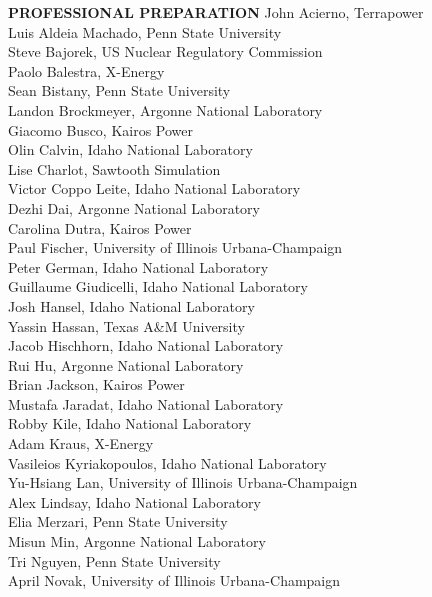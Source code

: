 \documentclass[11pt,letterpaper,english]{article}
\begin{document}
\begin{flushleft} {\bf PROFESSIONAL PREPARATION}
{John Acierno, Terrapower \\
Luis Aldeia Machado, Penn State University \\
Steve Bajorek, US Nuclear Regulatory Commission \\
Paolo Balestra, X-Energy \\
Sean Bistany, Penn State University \\
Landon	Brockmeyer, Argonne National Laboratory \\
Giacomo Busco, Kairos Power \\
Olin Calvin, Idaho National Laboratory \\
Lise Charlot, Sawtooth Simulation \\
Victor Coppo Leite, Idaho National Laboratory \\
Dezhi Dai, Argonne National Laboratory \\
Carolina Dutra, Kairos Power \\
Paul Fischer, University of Illinois Urbana-Champaign \\
Peter German, Idaho National Laboratory \\
Guillaume Giudicelli, Idaho National Laboratory \\
Josh Hansel, Idaho National Laboratory \\
Yassin Hassan, Texas A\&M University \\
Jacob Hischhorn, Idaho National Laboratory \\
Rui Hu, Argonne National Laboratory \\
Brian Jackson, Kairos Power \\
Mustafa Jaradat, Idaho National Laboratory \\
Robby Kile, Idaho National Laboratory \\
Adam Kraus, X-Energy \\
Vasileios Kyriakopoulos, Idaho National Laboratory \\
Yu-Hsiang Lan, University of Illinois Urbana-Champaign \\
Alex Lindsay, Idaho National Laboratory \\
Elia Merzari, Penn State University \\
Misun Min, Argonne National Laboratory \\
Tri Nguyen, Penn State University \\
April Novak, University of Illinois Urbana-Champaign \\
}
\end{flushleft}
\end{document}
